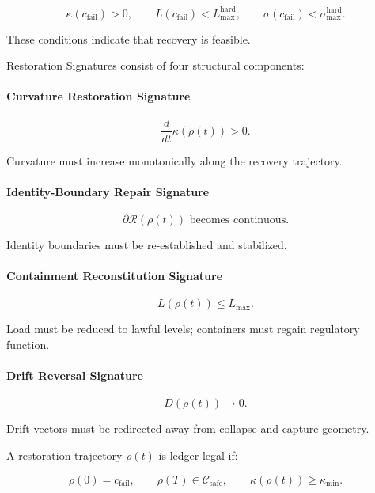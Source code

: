 \[
\kappa(c_{\mathrm{fail}}) > 0,
\qquad
L(c_{\mathrm{fail}}) < L_{\max}^{\mathrm{hard}},
\qquad
\sigma(c_{\mathrm{fail}}) < \sigma_{\max}^{\mathrm{hard}}.
\]



\noindent These conditions indicate that recovery is feasible.

\medskip

\noindent Restoration Signatures consist of four structural components:

\paragraph{Curvature Restoration Signature}


\[
\frac{d}{dt}\kappa(\rho(t)) > 0.
\]


Curvature must increase monotonically along the recovery trajectory.

\paragraph{Identity-Boundary Repair Signature}


\[
\partial\mathcal{R}(\rho(t)) \text{ becomes continuous}.
\]


Identity boundaries must be re-established and stabilized.

\paragraph{Containment Reconstitution Signature}


\[
L(\rho(t)) \le L_{\max}.
\]


Load must be reduced to lawful levels; containers must regain regulatory
function.

\paragraph{Drift Reversal Signature}


\[
D(\rho(t)) \rightarrow 0.
\]


Drift vectors must be redirected away from collapse and capture geometry.

\medskip

\noindent A restoration trajectory $\rho(t)$ is ledger-legal if:


\[
\rho(0) = c_{\mathrm{fail}},
\qquad
\rho(T) \in \mathcal{C}_{\mathrm{safe}},
\qquad
\kappa(\rho(t)) \ge \kappa_{\min}.
\]




